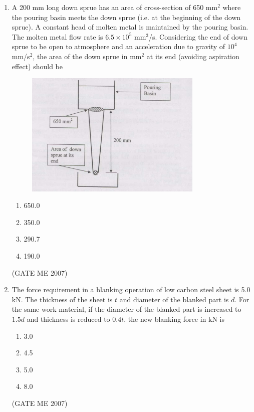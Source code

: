 \documentclass[journal]{IEEEtran}
\begin{document}
\begin{enumerate}
\item A 200 mm long down sprue has an area of cross-section of 650 mm$^2$ where the pouring basin meets the down sprue (i.e. at the beginning of the down sprue). A constant head of molten metal is maintained by the pouring basin. The molten metal flow rate is $ 6.5 \times 10^5 $ mm$^3$/s. Considering the end of down sprue to be open to atmosphere and an acceleration due to gravity of $ 10^4 $ mm/s$^2$, the area of the down sprue in mm$^2$ at its end (avoiding aspiration effect) should be

\begin{figure}[H]
    \centering
    \includegraphics[width=0.8\textwidth]{Fig 9.png}
    \caption{}
    \label{fig:question65}
\end{figure}

\begin{multicols}{4}
\begin{enumerate}
\item 650.0
\item 350.0
\item 290.7
\item 190.0
\end{enumerate}
\end{multicols}
\hfill (GATE ME 2007)

\item The force requirement in a blanking operation of low carbon steel sheet is 5.0 kN. The thickness of the sheet is $ t $ and diameter of the blanked part is $ d $. For the same work material, if the diameter of the blanked part is increased to $ 1.5d $ and thickness is reduced to $ 0.4t $, the new blanking force in kN is
\begin{multicols}{4}
\begin{enumerate}
\item 3.0
\item 4.5
\item 5.0
\item 8.0
\end{enumerate}
\end{multicols}
\hfill (GATE ME 2007)


\end{enumerate}
\end{document}
